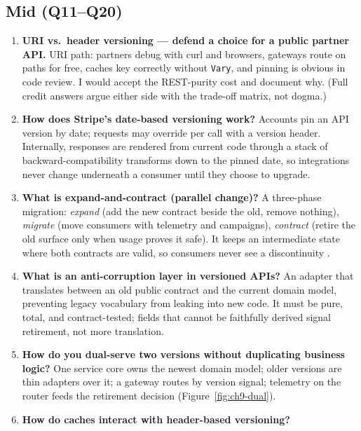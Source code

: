 \subsection*{Mid (Q11--Q20)}
\begin{enumerate}[label=\textbf{Q\arabic*.}, leftmargin=1.6cm, start=11]
  \item \textbf{URI vs.\ header versioning --- defend a choice for a public
        partner API.}
        URI path: partners debug with curl and browsers, gateways route on
        paths for free, caches key correctly without \texttt{Vary}, and
        pinning is obvious in code review. I would accept the REST-purity
        cost and document why. (Full credit answers argue either side with
        the trade-off matrix, not dogma.)
  \item \textbf{How does Stripe's date-based versioning work?}
        Accounts pin an API version by date; requests may override per call
        with a version header. Internally, responses are rendered from
        current code through a stack of backward-compatibility transforms
        down to the pinned date, so integrations never change underneath a
        consumer until they choose to upgrade.
  \item \textbf{What is expand-and-contract (parallel change)?}
        A three-phase migration: \emph{expand} (add the new contract beside
        the old, remove nothing), \emph{migrate} (move consumers with
        telemetry and campaigns), \emph{contract} (retire the old surface
        only when usage proves it safe). It keeps an intermediate state where
        both contracts are valid, so consumers never see a discontinuity
        \cite{kleppmann2017ddia}.
  \item \textbf{What is an anti-corruption layer in versioned APIs?}
        An adapter that translates between an old public contract and the
        current domain model, preventing legacy vocabulary from leaking into
        new code. It must be pure, total, and contract-tested; fields that
        cannot be faithfully derived signal retirement, not more translation.
  \item \textbf{How do you dual-serve two versions without duplicating
        business logic?}
        One service core owns the newest domain model; older versions are
        thin adapters over it; a gateway routes by version signal; telemetry
        on the router feeds the retirement decision
        (Figure~\ref{fig:ch9-dual}).
  \item \textbf{How do caches interact with header-based versioning?}

\end{enumerate}
